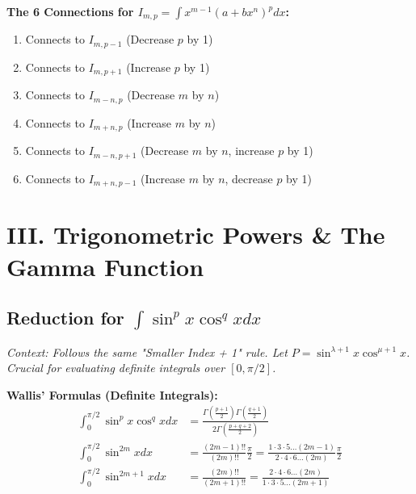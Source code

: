 \documentclass[11pt, a4paper]{article}
\begin{document}
\textbf{The 6 Connections for $I_{m,p} = \int x^{m-1}(a+bx^n)^p dx$:}
\begin{enumerate}[leftmargin=*, nosep, itemsep=1pt]
    \item Connects to $I_{m, p-1}$ (Decrease $p$ by 1)
    \item Connects to $I_{m, p+1}$ (Increase $p$ by 1)
    \item Connects to $I_{m-n, p}$ (Decrease $m$ by $n$)
    \item Connects to $I_{m+n, p}$ (Increase $m$ by $n$)
    \item Connects to $I_{m-n, p+1}$ (Decrease $m$ by $n$, increase $p$ by 1)
    \item Connects to $I_{m+n, p-1}$ (Increase $m$ by $n$, decrease $p$ by 1)
\end{enumerate}


\section*{\color{primary} III. Trigonometric Powers \& The Gamma Function}

\subsection*{\color{secondary} Reduction for $\int \sin^p x \cos^q x dx$}
\textit{\small Context: Follows the same "Smaller Index + 1" rule. Let $P = \sin^{\lambda+1} x \cos^{\mu+1} x$. Crucial for evaluating definite integrals over $[0, \pi/2]$.}

\textbf{\color{accent}Wallis' Formulas (Definite Integrals):}
\begin{align*}
    \int_0^{\pi/2} \sin^p x \cos^q x dx &= \frac{\Gamma\left(\frac{p+1}{2}\right)\Gamma\left(\frac{q+1}{2}\right)}{2\Gamma\left(\frac{p+q+2}{2}\right)} \\
    \int_0^{\pi/2} \sin^{2m} x dx &= \frac{(2m-1)!!}{(2m)!!} \frac{\pi}{2} = \frac{1 \cdot 3 \cdot 5 \dots (2m-1)}{2 \cdot 4 \cdot 6 \dots (2m)} \frac{\pi}{2} \\
    \int_0^{\pi/2} \sin^{2m+1} x dx &= \frac{(2m)!!}{(2m+1)!!} = \frac{2 \cdot 4 \cdot 6 \dots (2m)}{1 \cdot 3 \cdot 5 \dots (2m+1)}
\end{align*}
\end{document}
